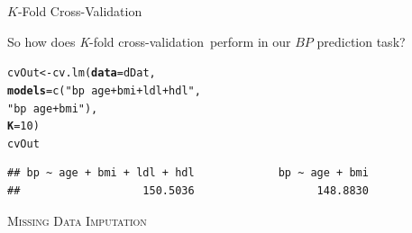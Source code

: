 \documentclass{beamer}\usepackage[]{graphicx}\usepackage[]{color}
\makeatletter
\newcommand{\hlnum}[1]{\textcolor[rgb]{0.69,0.494,0}{#1}}%
\newcommand{\hlstr}[1]{\textcolor[rgb]{0.749,0.012,0.012}{#1}}%
\newcommand{\hlstd}[1]{\textcolor[rgb]{0,0,0}{#1}}%
\newcommand{\hlkwb}[1]{\textcolor[rgb]{0,0.341,0.682}{#1}}%
\newcommand{\hlkwc}[1]{\textcolor[rgb]{0,0,0}{\textbf{#1}}}%
\newcommand{\hlkwd}[1]{\textcolor[rgb]{0.004,0.004,0.506}{#1}}%
\newenvironment{kframe}{%
 \def\at@end@of@kframe{}%
 \ifinner\ifhmode%
  \def\at@end@of@kframe{\end{minipage}}%
  \begin{minipage}{\columnwidth}%
 \fi\fi%
 \def\FrameCommand##1{\hskip\@totalleftmargin \hskip-\fboxsep
 \colorbox{shadecolor}{##1}\hskip-\fboxsep
     \hskip-\linewidth \hskip-\@totalleftmargin \hskip\columnwidth}%
 \MakeFramed {\advance\hsize-\width
   \@totalleftmargin\z@ \linewidth\hsize
   \@setminipage}}%
 {\par\unskip\endMakeFramed%
 \at@end@of@kframe}
\newenvironment{knitrout}{}{} %
\newcommand{\kfold}[0]{\emph{K}-fold cross-validation}
\makeatother
\begin{document}

\begin{frame}[fragile]{$K$-Fold Cross-Validation}
  
  So how does \kfold~perform in our $BP$ prediction task?
 
\begin{knitrout}\footnotesize
{}\color{fgcolor}\begin{kframe}
\begin{alltt}
\hlstd{cvOut} \hlkwb{<-} \hlkwd{cv.lm}\hlstd{(}\hlkwc{data}   \hlstd{= dDat,}
               \hlkwc{models} \hlstd{=} \hlkwd{c}\hlstd{(}\hlstr{"bp ~ age + bmi + ldl + hdl"}\hlstd{,}
                          \hlstr{"bp ~ age + bmi"}\hlstd{),}
               \hlkwc{K}      \hlstd{=} \hlnum{10}\hlstd{)}
\hlstd{cvOut}
\end{alltt}
\begin{verbatim}
## bp ~ age + bmi + ldl + hdl             bp ~ age + bmi 
##                   150.5036                   148.8830
\end{verbatim}
\end{kframe}
\end{knitrout}
  
\end{frame}

\watermarkon %
  
\begin{frame}{}
  
  \begin{center}
    \Huge{\textsc{Missing Data Imputation}}
  \end{center}
  
\end{frame}

\end{document}

